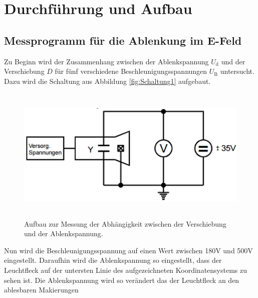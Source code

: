 \section{Durchführung und Aufbau}
\label{sec:Durchführung}
\subsection{Messprogramm für die Ablenkung im E-Feld}
Zu Beginn wird der Zusammenhang zwischen der Ablenkspannung $U_\text{d}$ und der Verschiebung $D$ für fünf verschiedene Beschleunigungsspannungen $U_\text{B}$ untersucht. Dazu wird die Schaltung aus Abbildung \eqref{fig:Schaltung1} aufgebaut.

\begin{figure}[H]
  \centering
  \includegraphics[height=6.5cm]{picture/Schaltung1}
  \caption{Aufbau zur Messung der Abhängigkeit zwischen der Verschiebung und der Ablenkspannung. \cite[5]{V501}}
  \label{fig:Schaltung1}
\end{figure}

Nun wird die Beschleunigungsspannung auf einen Wert zwischen 180V und 500V eingestellt. Daraufhin wird die Ablenkspannung so eingestellt, dass der Leuchtfleck auf der untersten Linie des aufgezeichneten Koordinatensystems zu sehen ist. Die Ablenkspannung wird so verändert das der Leuchtfleck an den ablesbaren Makierungen












\subsection{}
